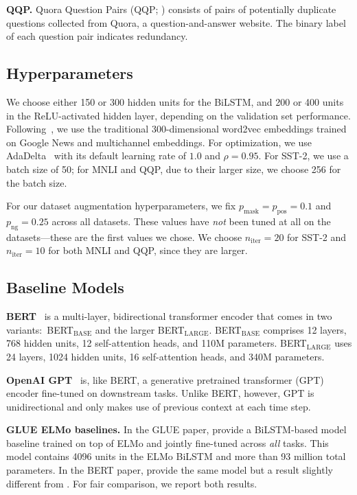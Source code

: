 \documentclass[11pt,a4paper]{article}
\newcommand{\parheader}[1]{{\smallskip \noindent \bf #1.}}
\begin{document}
\parheader{QQP}
Quora Question Pairs (QQP; \citealp{qqp}) consists of pairs of potentially duplicate questions collected from Quora, a question-and-answer website. 
The binary label of each question pair indicates redundancy.

\subsection{Hyperparameters}
We choose either 150 or 300 hidden units for the BiLSTM, and 200 or 400 units in the ReLU-activated hidden layer, depending on the validation set performance. Following~\citet{kim2014convolutional}, we use the traditional 300-dimensional word2vec embeddings trained on Google News and multichannel embeddings. For optimization, we use AdaDelta~\cite{zeiler2012adadelta} with its default learning rate of $1.0$ and $\rho=0.95$.
For SST-2, we use a batch size of 50; for MNLI and QQP, due to their larger size, we choose 256 for the batch size. 

For our dataset augmentation hyperparameters, we fix $p_\text{mask} = p_\text{pos} = 0.1$ and $p_\text{ng} = 0.25$ across all datasets. These values have \textit{not} been tuned at all on the datasets---these are the first values we chose. We choose $n_\text{iter} = 20$ for \mbox{SST-2} and $n_\text{iter} = 10$ for both MNLI and QQP, since they are larger.


\subsection{Baseline Models}

\textbf{BERT}~\cite{devlin2018bert} is a multi-layer, bidirectional transformer encoder that comes in two variants:~BERT$_{\text{BASE}}$ and the larger BERT$_{\text{LARGE}}$. BERT$_{\text{BASE}}$ comprises 12 layers, 768 hidden units, 12 self-attention heads, and 110M parameters. BERT$_{\text{LARGE}}$ uses 24 layers, 1024 hidden units, 16 self-attention heads, and 340M parameters.

\smallskip \noindent \textbf{OpenAI GPT}~\cite{radford2018improving}
is, like BERT, a generative pretrained transformer (GPT) encoder fine-tuned on downstream tasks. 
Unlike BERT, however, GPT is unidirectional and only makes use of previous context at each time step.

\parheader{GLUE ELMo baselines} 
In the GLUE paper, \citet{wang2018glue} provide a BiLSTM-based model baseline trained on top of ELMo and jointly fine-tuned across \textit{all} tasks. This model contains 4096 units in the ELMo BiLSTM and more than 93 million total parameters. In the BERT paper, \citet{devlin2018bert} provide the same model but a result slightly different from  \citet{wang2018glue}. For fair comparison, we report both results.
\end{document}
